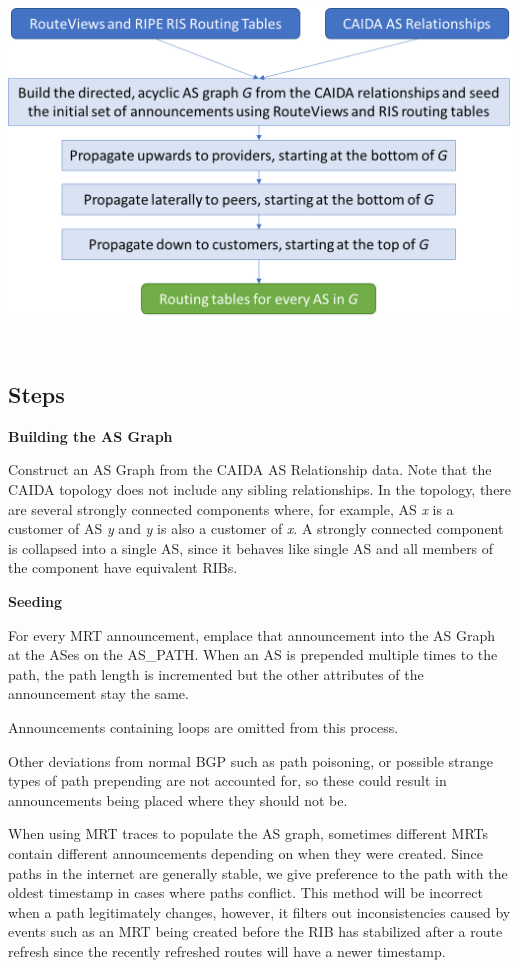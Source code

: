 \documentclass[letterpaper]{article}
\begin{document}
\includegraphics[width=6.1913in,height=3.81342in]{.//media/image1.png}

\hypertarget{steps}{%
\subsection{Steps}\label{steps}}

\textbf{Building the AS Graph}

Construct an AS Graph from the CAIDA AS Relationship data. Note that the
CAIDA topology does not include any sibling relationships. In the
topology, there are several strongly connected components where, for
example, AS \emph{x} is a customer of AS \emph{y} and \emph{y} is also a
customer of \emph{x}. A strongly connected component is collapsed into a
single AS, since it behaves like single AS and all members of the
component have equivalent RIBs.

\textbf{Seeding}

For every MRT announcement, emplace that announcement into the AS Graph
at the ASes on the AS\_PATH. When an AS is prepended multiple times to
the path, the path length is incremented but the other attributes of the
announcement stay the same.

Announcements containing loops are omitted from this process.

Other deviations from normal BGP such as path poisoning, or possible
strange types of path prepending are not accounted for, so these could
result in announcements being placed where they should not be.

When using MRT traces to populate the AS graph, sometimes different MRTs
contain different announcements depending on when they were created.  Since
paths in the internet are generally stable, we give preference to the path with
the oldest timestamp in cases where paths conflict. This method will be
incorrect when a path legitimately changes, however, it filters out
inconsistencies caused by events such as an MRT being created before the RIB
has stabilized after a route refresh since the recently refreshed routes will
have a newer timestamp.
\end{document}
